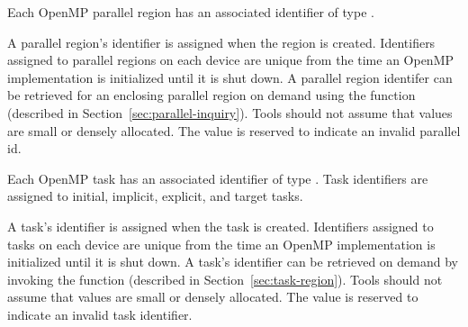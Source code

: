 Each OpenMP parallel region has an associated identifier of type
.
\begin{comment}
\begin{boxedcode}
typedef uint64\_t ompt\_parallel\_id\_t;
\end{boxedcode}
\end{comment}
  A parallel region's identifier is assigned
  when the region is created.  Identifiers assigned to parallel regions on each device are unique from the time an
  OpenMP implementation is initialized until it is shut down.
  A parallel region identifer can be retrieved for an enclosing parallel region
  on demand using the function   (described in Section~\ref{sec:parallel-inquiry}).
  Tools should not assume that  values are small or densely allocated.
  The value  is reserved to indicate an invalid parallel id.


Each OpenMP task has an associated identifier of type
. Task identifiers are assigned to
initial, implicit, explicit, and target tasks.
\begin{comment}
\begin{boxedcode}
typedef uint64\_t ompt\_task\_id\_t;
\end{boxedcode}
\end{comment}
  A task's identifier is assigned
  when the task is created.
  Identifiers assigned to tasks on each device are unique from the time an
  OpenMP implementation is initialized until it is shut down.
  A task's identifier can be retrieved
  on demand by invoking the   function (described in Section~\ref{sec:task-region}).
  Tools should not assume that  values are small or densely allocated.
  The value  is reserved to indicate an invalid task identifier.

